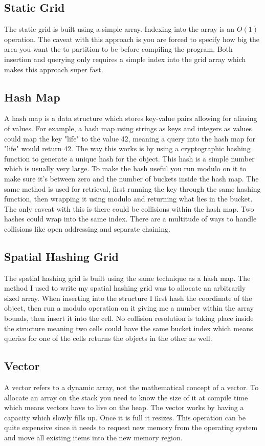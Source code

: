 \documentclass[a4paper, 12pt]{article}
\begin{document}
\subsection{Static Grid}
The static grid is built using a simple array. Indexing into the array is an
$O(1)$ operation. The caveat with this approach is you are forced to specify how
big the area you want the to partition to be before compiling the program. Both
insertion and querying only requires a simple index into the grid array which
makes this approach super fast.

\subsection{Hash Map}
A hash map is a data structure which stores key-value pairs allowing for
aliasing of values. For example, a hash map using strings as keys and integers
as values could map the key "life" to the value 42, meaning a query into the
hash map for "life" would return 42. The way this works is by using a
cryptographic hashing function to generate a unique hash for the object. This
hash is a simple number which is usually very large. To make the hash useful you
run modulo on it to make sure it's between zero and the number of buckets inside
the hash map. The same method is used for retrieval, first running the key
through the same hashing function, then wrapping it using modulo and returning
what lies in the bucket. The only caveat with this is there could be collisions
within the hash map. Two hashes could wrap into the same index. There are a
multitude of ways to handle collisions like open addressing and separate
chaining.

\subsection{Spatial Hashing Grid}
The spatial hashing grid is built using the same technique as a hash map. The
method I used to write my spatial hashing grid was to allocate an arbitrarily
sized array. When inserting into the structure I first hash the coordinate of
the object, then run a modulo operation on it giving me a number within the
array bounds, then insert it into the cell. No collision resolution is
taking place inside the structure meaning two cells could have the same bucket
index which means queries for one of the cells returns the objects in the other
as well.

\subsection{Vector}
A vector refers to a dynamic array, not the mathematical concept of a vector.
To allocate an array on the stack you need to know the size of it at compile
time which means vectors have to live on the heap. The vector works by having a
capacity which slowly fills up. Once it is full it resizes. This operation can
be quite expensive since it needs to request new memory from the operating
system and move all existing items into the new memory region.
\end{document}
